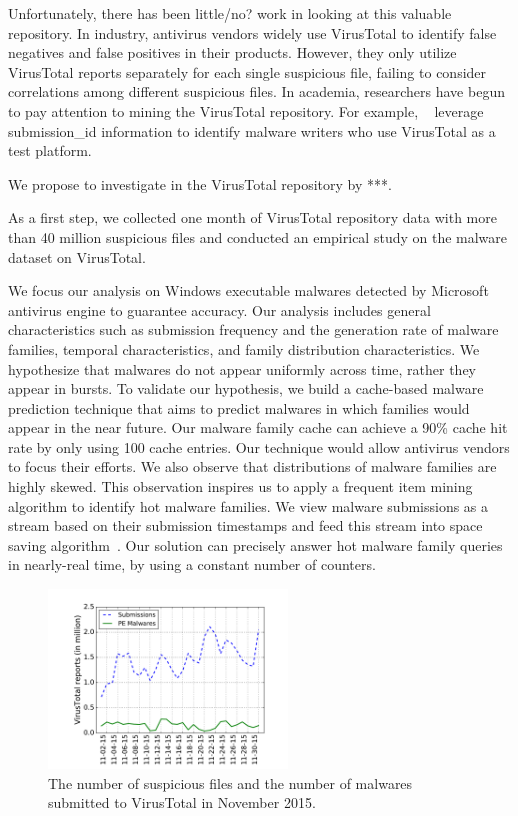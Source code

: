 Unfortunately, there has been little/no? work in looking at this valuable repository.
In industry, antivirus vendors widely use VirusTotal to identify false negatives 
and false positives in their products. 
However, they only utilize VirusTotal reports separately for each single suspicious file, 
failing to consider correlations among different suspicious files. 
In academia, researchers have begun to pay attention to mining the VirusTotal repository. 
For example, ~\citet{neeles} leverage submission\_id information to identify malware writers 
who use VirusTotal as a test platform. 

We propose to investigate in the VirusTotal repository by ***.

As a first step, we collected one month of VirusTotal repository data with more than 40 million suspicious files
and conducted an empirical study on the malware dataset on VirusTotal. 

We focus our analysis on Windows executable malwares detected by Microsoft
antivirus engine to guarantee accuracy. 
Our analysis includes general characteristics such as submission frequency and the generation rate of malware families, 
temporal characteristics, and family distribution characteristics. 
We hypothesize that malwares do not appear uniformly across time, rather they appear in bursts. 
To validate our hypothesis, we build a cache-based malware prediction technique that aims to predict malwares in which families would appear in the near future. 
Our malware family cache can achieve a 90\% cache hit rate by only using 100 cache entries.
Our technique would allow antivirus vendors to focus their efforts. 
We also observe that distributions of malware families are highly skewed. 
This observation inspires us to apply a frequent item mining algorithm to 
identify hot malware families. 
We view malware submissions as a stream based on their submission timestamps and 
feed this stream into space saving algorithm~\cite{space-saving}. 
Our solution can precisely answer hot malware family queries in nearly-real time, by using a constant number of counters.  


\begin{figure}[t!]
\begin{center}
\includegraphics[width=2.5in]{figure/nov}
\caption{The number of suspicious files and the number of malwares submitted to VirusTotal in November 2015. }
\label{fig:subnum}
\end{center}
\end{figure}

